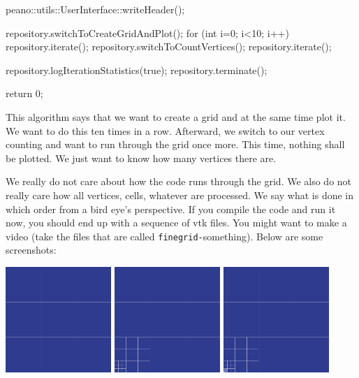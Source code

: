 \begin{code}
  peano::utils::UserInterface::writeHeader();

  repository.switchToCreateGridAndPlot();
  for (int i=0; i<10; i++) repository.iterate();
  repository.switchToCountVertices(); repository.iterate();

  repository.logIterationStatistics(true);
  repository.terminate();

  return 0;
\end{code}

\noindent
This algorithm says that we want to create a grid and at the same time plot it.
We want to do this ten times in a row.
Afterward, we switch to our vertex counting and want to run through the grid
once more. 
This time, nothing shall be plotted.
We just want to know how many vertices there are.


We really do not care about how the code runs through the grid.
We also do not really care how all vertices, cells, whatever are processed.
We say what is done in which order from a bird eye's perspective.
If you compile the code and run it now, you should end up with a sequence of vtk
files. 
You might want to make a video (take the files that are called
\texttt{finegrid-}something).
Below are some screenshots:


\begin{center}
  \includegraphics[width=0.3\textwidth]{3_basics/grid00.png}
  \includegraphics[width=0.3\textwidth]{3_basics/grid01.png}
  \includegraphics[width=0.3\textwidth]{3_basics/grid02.png}
\end{center}


